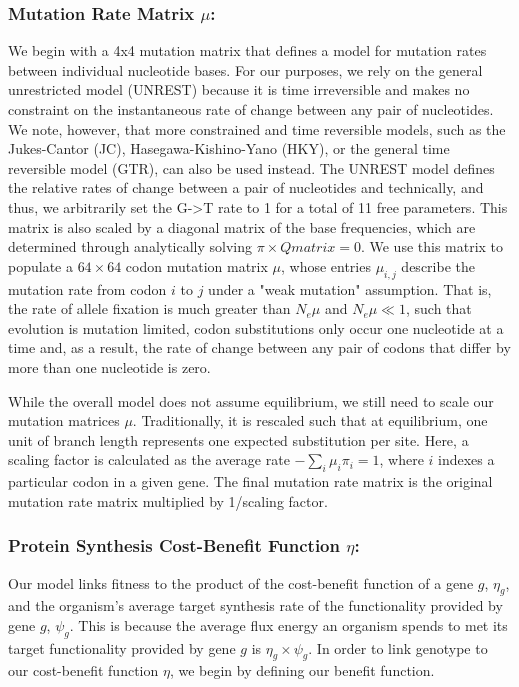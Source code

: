 \documentclass{article}
\newcommand{\Nemu}{\ensuremath{{N_e \mu}}\xspace} %
\newcommand{\etag}{\ensuremath{\eta_g}\xspace}
\newcommand{\muij}{\ensuremath{\mu_{i,j}}\xspace}
\newcommand{\psig}{\ensuremath{\psi_{g}}\xspace}
\begin{document}
\subsubsection*{Mutation Rate Matrix $\mu$: }
We begin with a 4x4 mutation matrix that defines a model for mutation rates between individual nucleotide bases.
For our purposes, we rely on the general unrestricted model (UNREST) \citep{Yang1994} because it is time irreversible and makes no constraint on the instantaneous rate of change between any pair of nucleotides. 
We note, however, that more constrained and time reversible models, such as the Jukes-Cantor (JC), Hasegawa-Kishino-Yano (HKY), or the general time reversible model (GTR), can also be used instead.
The UNREST model defines the relative rates of change between a pair of nucleotides and technically, and thus, we arbitrarily set the G->T rate to 1 for a total of 11 free parameters.
This matrix is also scaled by a diagonal matrix of the base frequencies, which are determined through analytically solving $\pi \times Qmatrix = 0$.
We use this matrix to populate a $64 \times 64$ codon mutation matrix $\mu$, whose entries $\muij$ describe the mutation rate from codon $i$ to $j$ under a "weak mutation" assumption.
That is, the rate of allele fixation is much greater than \Nemu and $\Nemu \ll 1$, such that evolution is mutation limited, codon substitutions only occur one nucleotide at a time and, as a result, the rate of change between any pair of codons that differ by more than one nucleotide is zero.

While the overall model does not assume equilibrium, we still need to scale our mutation matrices $\mu$.
Traditionally, it is rescaled such that at equilibrium, one unit of branch length represents one expected substitution per site.
Here, a scaling factor is calculated as the average rate $-\sum_i \mu_i \pi_i=1$, where $i$ indexes a particular codon in a given gene.
The final mutation rate matrix is the original mutation rate matrix multiplied by 1/scaling factor.

\subsubsection*{Protein Synthesis Cost-Benefit Function $\eta$: }
Our model links fitness to the product of the cost-benefit function of a gene $g$, $\etag$, and the organism's average target synthesis rate of the functionality provided by gene $g$, $\psig$.
This is because the average flux energy an organism spends to met its target functionality provided by gene $g$ is $\etag \times \psig$.
In order to link genotype to our cost-benefit function $\eta$, we begin by defining our benefit function.
\end{document}
